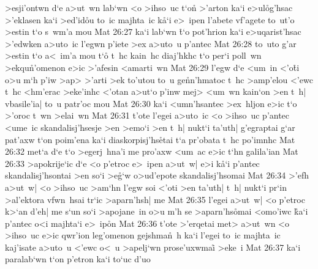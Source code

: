 >esji'ontwn
d`e
a>ut~wn
lab`wn
<o
>ihso~uc
t`o\r{n}
>'arton
ka`i
e>ul\r{o}g'hsac
>'eklasen
ka`i
>ed'id\r{o}u
to~ic
majhta~ic
k\r{a}`i
e>~ipen
l'abete
vf'agete
to~ut'o
>estin
t`o
s~wm'a
mou\bibvsend
\vs Mat 26:27
ka`i
lab`wn
\r{t}`o
pot'hrion
ka`i
e>uqarist'hsac
>'edwken
a>uto~ic
l'egwn
p'iete
>ex
a>uto~u
p'antec\bibvsend
\vs Mat 26:28
to~uto
g'ar
>estin
t`o
a<~im'a
mou
t`o\r{}
t~hc
kain~hc
diaj'hkhc
t`o
per`i
poll~wn
>ekqu\r{n}'omenon
e>ic
>'afesin
<amarti~wn\bibvsend
\vs Mat 26:29
l'egw
d`e
<um~in
<'o\r{t}i
o>u
m`h
p'iw
>ap>
>'arti
>ek
to'utou
to~u
ge\r{n}n'hmatoc
t~hc
>amp'elou
<'ewc
t~hc
<hm'erac
>eke'inhc
<'otan
a>ut`o
p'inw
mej>
<um~wn
kain`on
>en
t~h|
vbasile'ia|
to~u
patr'oc
mou\bibvsend
\vs Mat 26:30
ka`i
<umn'hsantec
>ex~hljon
e>ic
t`o
>'oroc
t~wn
>elai~wn\bibvsend
\vs Mat 26:31
t'ote
l'egei
a>uto~ic
<o
>ihso~uc
p'antec
<ume~ic
skandalisj'hsesje
>en
>emo`i
>en
t~h|
nukt`i
ta'uth|
g'egraptai
g`ar
pat'axw
t`on
poim'ena
ka`i
diaskorpisj'hs\r{e}tai
t`a
pr'obata
t~hc
po'imnhc\bibvsend
\vs Mat 26:32
met`a
d`e
t`o
>egerj~hna'i
me
pro'axw
<um~ac
e>ic
t`hn
galila'ian\bibvsend
\vs Mat 26:33
>apokrije`ic
d`e
<o
p'etroc
e>~ipen
a>ut~w|
e>i
k\r{a}`i
p'antec
skandalisj'hsontai
>en
so`i
>e\r{g}`w
o>ud'epote
skandalisj'hsomai\bibvsend
\vs Mat 26:34
>'efh
a>ut~w|
<o
>ihso~uc
>am`hn
l'egw
soi
<'oti
>en
ta'uth|
t~h|
nukt`i
pr`in
>al'ektora
vfwn~hsai
tr`ic
>aparn'hsh|
me\bibvsend
\vs Mat 26:35
l'egei
a>ut~w|
<o
p'etroc
k>`an
d'eh|
me
s`un
so`i
>apojane~in
o>u
m'h
se
>aparn'hs\r{o}mai
<omo'iwc
\r{k}a`i
p'antec
o<i
majhta`i
e>~ip\r{o}n\bibvsend
{}
\vs Mat 26:36
t'ote
>'erqetai
met>
a>ut~wn
<o
>ihso~uc
e>ic
qwr'ion
leg'omenon
gejshma\r{n}~h
ka`i
l'egei
to~ic
majhta~ic
kaj'isate
a>uto~u
<'ewc
o<~u
>apelj`wn
prose'uxwmai\r{}
>eke~i\bibvsend
\vs Mat 26:37
ka`i
paralab`wn
t`on
p'etron
ka`i
to`uc
d'uo

